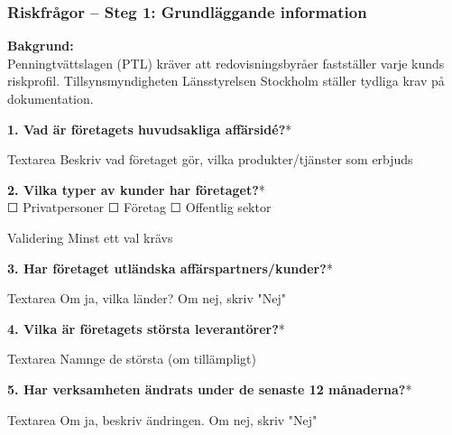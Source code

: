 \documentclass[10pt]{beamer}
\begin{document}
\begin{frame}[label=riskfragor-steg1]
  \frametitle{Riskfrågor – Steg 1: Grundläggande information}

  \vspace{0.3cm}

  \footnotesize
  \textbf{Bakgrund:}\\
  Penningtvättslagen (PTL) kräver att redovisningsbyråer fastställer varje kunds riskprofil. Tillsynsmyndigheten Länsstyrelsen Stockholm ställer tydliga krav på dokumentation.

  \vspace{0.4cm}

  \textbf{1. Vad är företagets huvudsakliga affärsidé?}*
  \begin{block}{Textarea}
    \tiny Beskriv vad företaget gör, vilka produkter/tjänster som erbjuds
  \end{block}

  \vspace{0.2cm}

  \textbf{2. Vilka typer av kunder har företaget?}*\\
  \tiny
  ☐ Privatpersoner \hspace{0.5cm} ☐ Företag \hspace{0.5cm} ☐ Offentlig sektor
  \begin{block}{Validering}
    \tiny Minst ett val krävs
  \end{block}

  \vspace{0.2cm}

  \textbf{3. Har företaget utländska affärspartners/kunder?}*
  \begin{block}{Textarea}
    \tiny Om ja, vilka länder? Om nej, skriv "Nej"
  \end{block}

  \vspace{0.2cm}

  \textbf{4. Vilka är företagets största leverantörer?}*
  \begin{block}{Textarea}
    \tiny Namnge de största (om tillämpligt)
  \end{block}

  \vspace{0.2cm}

  \textbf{5. Har verksamheten ändrats under de senaste 12 månaderna?}*
  \begin{block}{Textarea}
    \tiny Om ja, beskriv ändringen. Om nej, skriv "Nej"
  \end{block}


\end{frame}
\end{document}
